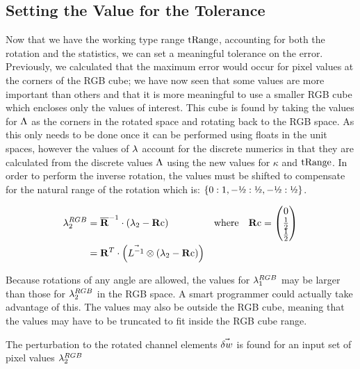\subsection{Setting the Value for the Tolerance}
Now that we have the working type range $\text{tRange}$, accounting for both the rotation and the statistics, we can set a meaningful tolerance on the error. Previously, we calculated that the maximum error would occur for pixel values at the corners of the RGB cube; we have now seen that some values are more important than others and that it is more meaningful to use a smaller RGB cube which encloses only the values of interest. This cube is found by taking the values for $\Lambda$ as the corners in the rotated space and rotating back to the RGB space. As this only needs to be done once it can be performed using floats in the unit spaces, however the values of $\lambda$ account for the discrete numerics in that they are calculated from the discrete values $\Lambda$ using the new values for $\kappa$ and $\text{tRange}$. In order to perform the inverse rotation, the values must be shifted to compensate for the natural range of the rotation which is: $\{0:1,-\text{\textonehalf}:\text{\textonehalf},-\text{\textonehalf}:\text{\textonehalf}\}$. 

\begin{align}
\discard^{RGB}_2 &= \nR^{-1} \cdot \left( \discard_2 - \Rc
        \right) & \text{where} \quad \Rc=\begin{pmatrix}
                 0   \\
                 \frac{1}{2}    \\
                 \frac{1}{2}     \\
                \end{pmatrix} \\
&= \R^{T} \cdot \left( \nS \otimes \left( \discard_2 - \Rc
                \right) \right)  
\end{align}

Because rotations of any angle are allowed, the values for $\lambda^{RGB}_1$ may be larger than those for $\lambda^{RGB}_2$ in the RGB space. A smart programmer could actually take advantage of this. The values may also be outside the RGB cube, meaning that the values may have to be truncated to fit inside the RGB cube range. 

The perturbation to the rotated channel elements $\vec{\delta w}$ is found for an input set of pixel values $\lambda^{RGB}_2$

